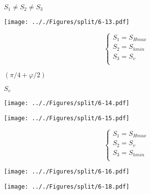 \documentclass[onecolumn,11pt]{report}
\def\lthtmlcheckvsize{\ifdim\ht\sizebox<\vsize 
  \ifdim\wd\sizebox<\hsize\expandafter\hfill\fi \expandafter\vfill
  \else\expandafter\vss\fi}%
\begin{document}
{\newpage\clearpage
{}%
$ S_1 \neq S_2 \neq S_3$%
\lthtmlindisplaymathZ
\lthtmlcheckvsize\clearpage}

{\newpage\clearpage
{}%
\texttt{[image: .././Figures/split/6-13.pdf]}%
\lthtmlpictureZ
\lthtmlcheckvsize\clearpage}

{\newpage\clearpage
{}%
\begin{displaymath}\left\lbrace
\begin{array}{l}
S_1 = S_{Hmax} \\
S_2 = S_{hmin} \\
S_3 = S_v \\
\end{array}
\right.\end{displaymath}%
\lthtmldisplayZ
\lthtmlcheckvsize\clearpage}

{\newpage\clearpage
{}%
$ (\pi/4 + \varphi/2)$%
\lthtmlindisplaymathZ
\lthtmlcheckvsize\clearpage}

{\newpage\clearpage
{}%
$ S_{v}$%
\lthtmlindisplaymathZ
\lthtmlcheckvsize\clearpage}

{\newpage\clearpage
{}%
\texttt{[image: .././Figures/split/6-14.pdf]}%
\lthtmlpictureZ
\lthtmlcheckvsize\clearpage}

{\newpage\clearpage
{}%
\texttt{[image: .././Figures/split/6-15.pdf]}%
\lthtmlpictureZ
\lthtmlcheckvsize\clearpage}

{\newpage\clearpage
{}%
\begin{displaymath}\left\lbrace
\begin{array}{l}
S_1 = S_{Hmax} \\
S_2 = S_v \\
S_3 = S_{hmin} \\
\end{array}
\right.\end{displaymath}%
\lthtmldisplayZ
\lthtmlcheckvsize\clearpage}

{\newpage\clearpage
{}%
\texttt{[image: .././Figures/split/6-16.pdf]}%
\lthtmlpictureZ
\lthtmlcheckvsize\clearpage}

{\newpage\clearpage
{}%
\texttt{[image: .././Figures/split/6-18.pdf]}%
\lthtmlpictureZ
\lthtmlcheckvsize\clearpage}
\end{document}
